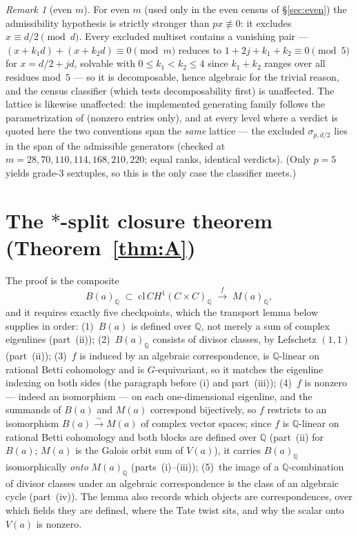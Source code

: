 \documentclass[11pt]{amsart}
\theoremstyle{remark}
\newtheorem{remark}[theorem]{Remark}
\newcommand{\Q}{\mathbb{Q}}
\newcommand{\V}{V}
\begin{document}
\begin{remark}[even $m$]\label{rem:evenstd}
For even $m$ (used only in the even census of \S\ref{sec:even}) the admissibility hypothesis is
strictly stronger than $px\not\equiv0$: it excludes $x\equiv d/2\pmod d$. Every excluded multiset
contains a vanishing pair --- $(x+k_1d)+(x+k_2d)\equiv0\pmod m$ reduces to $1+2j+k_1+k_2\equiv0\pmod5$
for $x=d/2+jd$, solvable with $0\le k_1<k_2\le4$ since $k_1+k_2$ ranges over all residues mod~$5$ ---
so it is decomposable, hence algebraic for the trivial reason, and the census classifier (which tests
decomposability first) is unaffected. The lattice is likewise unaffected: the implemented
generating family follows the parametrization of \cite[\S2]{Aoki00} (nonzero entries only),
and at every level where a verdict is quoted here the two conventions span the \emph{same}
lattice --- the excluded $\sigma_{p,d/2}$ lies in the span of the admissible generators
(checked at $m=28,70,110,114,168,210,220$; equal ranks, identical verdicts). (Only $p=5$ yields grade-$3$ sextuples, so this is the only
case the classifier meets.)
\end{remark}

\section{The \texorpdfstring{$*$}{*}-split closure theorem (Theorem~\ref{thm:A})}\label{sec:A}

The proof is the composite
\[
B(a)_\Q\;\subset\;\mathrm{cl}\,CH^1(C\times C)_\Q
\;\xrightarrow{\ f\ }\;M(a)_\Q ,
\]
and it requires exactly five checkpoints, which the transport lemma below supplies in order:
(1)~$B(a)$ is defined over $\Q$, not merely a sum of complex eigenlines (part~(ii));
(2)~$B(a)_\Q$ consists of divisor classes, by Lefschetz $(1,1)$ (part~(ii));
(3)~$f$ is induced by an algebraic correspondence, is $\Q$-linear on rational Betti cohomology
and is $G$-equivariant, so it matches the eigenline indexing on both sides (the paragraph before
(i) and part~(iii)); (4)~$f$ is nonzero --- indeed an isomorphism --- on each one-dimensional
eigenline, and the summands of $B(a)$ and $M(a)$ correspond bijectively, so $f$ restricts to an
isomorphism $B(a)\xrightarrow{\sim}M(a)$ of complex vector spaces; since $f$ is $\Q$-linear on
rational Betti cohomology and both blocks are defined over $\Q$ (part~(ii) for $B(a)$; $M(a)$ is
the Galois orbit sum of $\V(a)$), it carries $B(a)_\Q$ isomorphically \emph{onto} $M(a)_\Q$
(parts~(i)--(iii)); (5)~the image of a $\Q$-combination of divisor
classes under an algebraic correspondence is the class of an algebraic cycle (part~(iv)).
The lemma also records which objects are correspondences, over which fields they are defined,
where the Tate twist sits, and why the scalar onto $\V(a)$ is nonzero.
\end{document}
